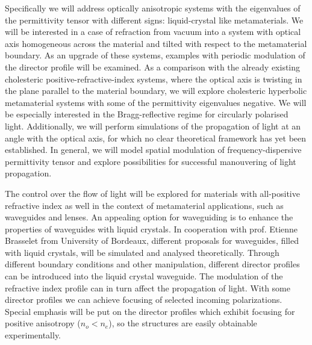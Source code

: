 \documentclass[a4paper,11pt]{article}
\begin{document}
Specifically we will address optically anisotropic systems with the eigenvalues of the permittivity tensor with different signs: liquid-crystal like metamaterials. 
We will be interested in a case of refraction from vacuum into a system with optical axis homogeneous across the material and tilted with respect to the metamaterial boundary. 
As an upgrade of these systems, examples with periodic modulation of the director profile will be examined. 
As a comparison with the already existing cholesteric positive-refractive-index systems, where the optical axis is twisting in the plane parallel to the material boundary, we will explore cholesteric hyperbolic metamaterial systems with some of the permittivity eigenvalues negative.
We will be especially interested in the Bragg-reflective regime for circularly polarised light. 
Additionally, we will perform simulations of the propagation of light at an angle with the optical axis, for which no clear theoretical framework has yet been established. 
In general, we will model spatial modulation of frequency-dispersive permittivity tensor and explore possibilities for successful manouvering of light propagation.  



The control over the flow of light will be explored for materials with all-positive refractive index as well in the context of metamaterial applications, such as waveguides and lenses. 
An appealing option for waveguiding is to enhance the properties of waveguides with liquid crystals. 
In cooperation with prof. Etienne Brasselet from University of Bordeaux, different proposals for waveguides, filled with liquid crystals, will be simulated and analysed theoretically. 
Through different boundary conditions and other manipulation, different director profiles can be introduced into the liquid crystal waveguide. 
The modulation of the refractive index profile can in turn affect the propagation of light. 
With some director profiles we can achieve focusing of selected incoming polarizations.
Special emphasis will be put on the director profiles which exhibit focusing for positive anisotropy ($n_{o} < n_e$), so the structures are easily obtainable experimentally. 
\end{document}
